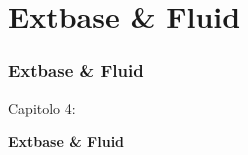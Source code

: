 %

\section{Extbase \& Fluid}
\begin{frame}[fragile]
	\frametitle{Extbase \& Fluid}

	\begin{center}\huge{Capitolo 4:}\end{center}
	\begin{center}\huge{\color{typo3darkgrey}\textbf{Extbase \& Fluid}}\end{center}

\end{frame}

